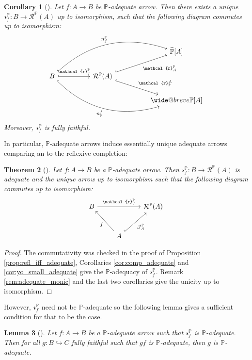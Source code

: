 \documentclass[10pt,a4paper]{article}
\makeatletter
\newcommand{\bb}[1]{\mathbb{#1}}
\newcommand{\ca}[1]{\mathcal{#1}}
\newcommand{\PP}{{\bb P}}
\newcommand{\copsh}[2]{{\widebreve{#1}}[{#2}]}
\newcommand{\psh}[2]{{\widehat{#1}}[{#2}]}
\def\widebreve{\mathpalette\wide@breve}
\def\wide@breve#1#2{\sbox\z@{$#1#2$}%
     \mathop{\vbox{\m@th\ialign{##\crcr
\kern0.08em\brevefill#1{0.8\wd\z@}\crcr\noalign{\nointerlineskip}%
                    $\hss#1#2\hss$\crcr}}}\limits}
\def\brevefill#1#2{$\m@th\sbox\tw@{$#1($}%
  \hss\resizebox{#2}{\wd\tw@}{\rotatebox[origin=c]{90}{\upshape(}}\hss$}
\theoremstyle{plain}
\newtheorem{theorem}{Theorem}[subsection]
\newtheorem{corollary}[theorem]{Corollary}
\newtheorem{lemma}[theorem]{Lemma}
\theoremstyle{definition}
\theoremstyle{remark}
\makeatother
\begin{document}
\begin{corollary}[{\cite[Corollary 8.3]{averyleinster}}]
    \label{cor:rf_existence_ff}
    Let $f : A \to B$ be $\PP$-adequate arrow. Then there exists a unique $\ca{r}_f^\PP : B \to \ca{R}^\PP(A)$ up to isomorphism, such that the following diagram commutes up to isomorphism:
    \[\begin{tikzcd}[column sep=huge]
        &&\psh\PP A\\
        B \ar[urr, "n_f^\PP", hook, bend left] \ar[r, "\ca{r}_f^\PP", hook] \ar[drr, "n^f_\PP"', hook, bend right] & \ca{R}^\PP(A) \ar[ur, hook, "\ca{r}_A^\PP"'] \ar[dr, hook, "\ca{r}^A_\PP"] &\\
        && \copsh\PP A
    \end{tikzcd}\]
    Moreover, $\ca{r}_f^\PP$ is fully faithful.
\end{corollary}

In particular, $\PP$-adequate arrows induce essentially unique adequate arrows comparing an to the reflexive completion:

\begin{theorem}[{\cite[Theorem 8.4]{averyleinster}}]
    \label{th:pu_reflexive_completion}
    Let $f : A \to B$ be a $\PP$-adequate arrow. Then $\ca{r}_f^\PP : B \to \ca{R}^\PP(A)$ is adequate and the unique arrow up to isomorphism such that the following diagram commutes up to isomorphism:
    \[\begin{tikzcd}[row sep=large]
        B \ar[rr, "\ca{r}_f^\PP"] && \ca{R}^\PP(A)\\
        & A \ar[ul, "f"] \ar[ur, hook, "\ca{J}_A^\PP"'] &
    \end{tikzcd}\]
\end{theorem}

\begin{proof}
    The commutativity was checked in the proof of Proposition \ref{prop:refl_iff_adequate}, Corollaries \ref{cor:comp_adequate} and \ref{cor:yo_small_adequate} give the $\PP$-adequacy of $\ca{r}_f^\PP$. Remark \ref{rem:adequate_monic} and the last two corollaries give the unicity up to isomorphism.
\end{proof}

However, $\ca r_f^\PP$ need not be $\PP$-adequate so the following lemma gives a sufficient condition for that to be the case.

\begin{lemma}[{\cite[Lemma 8.8]{averyleinster}}]
    Let $f : A \to B$ be a $\PP$-adequate arrow such that $\ca{r}_f^\PP$ is $\PP$-adequate. Then for all $g : B \hookrightarrow C$ fully faithful such that $gf$ is $\PP$-adequate, then $g$ is $\PP$-adequate.
\end{lemma}
\end{document}
